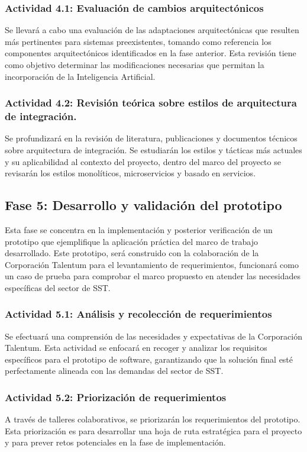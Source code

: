 \subsubsection{Actividad 4.1: Evaluación de cambios arquitectónicos}
Se llevará a cabo una evaluación de las adaptaciones arquitectónicas que resulten más pertinentes para sistemas preexistentes, tomando como referencia los componentes arquitectónicos identificados en la fase anterior. Esta revisión tiene como objetivo determinar las modificaciones necesarias que permitan la incorporación de la Inteligencia Artificial.

\subsubsection{Actividad 4.2: Revisión teórica sobre estilos de arquitectura de integración.}
Se profundizará en la revisión de literatura, publicaciones y documentos técnicos sobre arquitectura de integración. Se estudiarán los estilos y tácticas más actuales y su aplicabilidad al contexto del proyecto, dentro del marco del proyecto se revisarán los estilos monolíticos, microservicios y basado en servicios.





\subsection{Fase 5: Desarrollo y validación del prototipo}
Esta fase se concentra en la implementación y posterior verificación de un prototipo que ejemplifique la aplicación práctica del marco de trabajo desarrollado. Este prototipo, será construido con la colaboración de la Corporación Talentum para el levantamiento de requerimientos, funcionará como un caso de prueba para comprobar el marco propuesto en atender las necesidades específicas del sector de SST.

\subsubsection{Actividad 5.1: Análisis y recolección de requerimientos}
Se efectuará una comprensión de las necesidades y expectativas de la Corporación Talentum. Esta actividad se enfocará en recoger y analizar los requisitos específicos para el prototipo de software, garantizando que la solución final esté perfectamente alineada con las demandas del sector de SST.

\subsubsection{Actividad 5.2: Priorización de requerimientos}
A través de talleres colaborativos, se priorizarán los requerimientos del prototipo. Esta priorización es para desarrollar una hoja de ruta estratégica para el proyecto y para prever retos potenciales en la fase de implementación.

